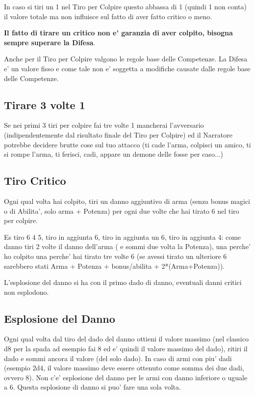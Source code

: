 \documentclass[a4paper,11pt,twoside,openany]{book}
\begin{document}
In caso si tiri un 1 nel Tiro per Colpire questo abbassa di 1 (quindi 1 non conta) il valore totale ma non influisce sul fatto di aver fatto critico o meno.

\textbf{Il fatto di tirare un critico non e' garanzia di aver colpito,
bisogna sempre superare la Difesa}.

Anche per il Tiro per Colpire valgono le regole base delle Competenze.
La Difesa e' un valore fisso e come tale non e' soggetta a modifiche
causate dalle regole base delle Competenze.

\subsection{Tirare 3 volte 1}

Se nei primi 3 tiri per colpire fai tre volte 1 mancherai l'avversario (indipendentemente dal risultato finale del Tiro per Colpire) ed il Narratore potrebbe decidere brutte cose sul tuo attacco (ti cade l'arma, colpisci un amico, ti si rompe l'arma, ti ferisci, cadi, appare un demone delle fosse per caso...)

\subsection{Tiro Critico}

Ogni qual volta hai colpito, tiri un danno aggiuntivo di arma (senza bonus magici o di Abilita', solo arma + Potenza) per ogni due volte che hai tirato 6 nel tiro per colpire.

Es tiro 6 4 5, tiro in aggiunta 6, tiro in aggiunta un 6, tiro in aggiunta 4: come danno tiri 2 volte il danno dell'arma ( e sommi due volta la Potenza), una perche' ho colpito una perche' hai tirato tre volte 6 (se avessi tirato un ulteriore 6 sarebbero stati Arma + Potenza + bonus/abilita + 2{*}(Arma+Potenza)).

L'esplosione del danno si ha con il primo dado di danno, eventuali danni critici non esplodono.

\subsection{Esplosione del Danno}

Ogni qual volta dal tiro del dado del danno ottieni il valore massimo (nel classico d8 per la spada ad esempio fai 8 ed e' quindi il valore massimo del dado), ritiri il dado e sommi ancora il valore (del solo dado). In caso di armi con piu' dadi (esempio 2d4, il valore massimo deve essere ottenuto come somma dei due dadi, ovvero 8). Non c'e' esplosione del danno per le armi con danno inferiore o uguale a 6. Questa esplosione di danno si puo' fare una sola volta.
\end{document}
